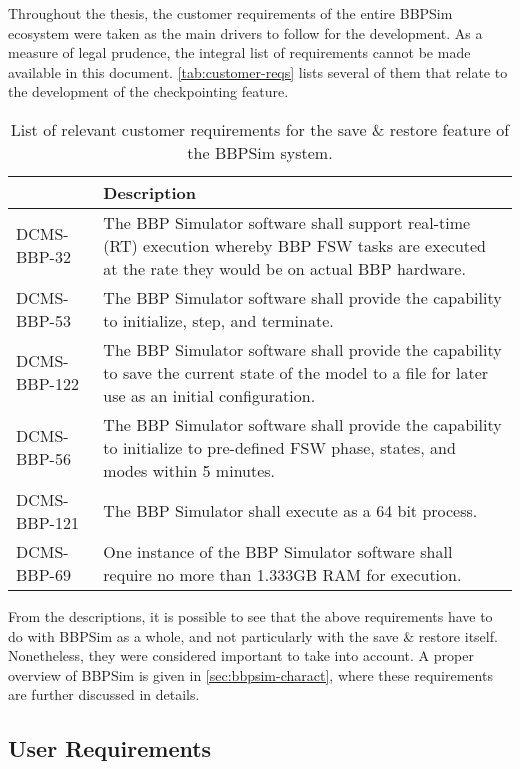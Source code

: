 {Throughout the thesis, the customer requirements of the entire \gls{BBPSim} ecosystem were taken as the main drivers to follow for the development. As a measure of legal prudence, the integral list of requirements cannot be made available in this document. \autoref{tab:customer-reqs} lists several of them that relate to the development of the checkpointing feature.  
\begin{table}[htbp]
	\vspace{12pt}
	\centering
	\begin{tabularx}{\linewidth}{>{\centering}p{3cm} X}
		\toprule
		{\bfseries Requirement\newline Number} & \textbf{Description}\\
		\midrule
		DCMS-BBP-32 & {The BBP Simulator software shall support real-time (RT) execution whereby BBP FSW tasks are executed at the rate they would be on actual BBP hardware.}\\
		\midrule
		DCMS-BBP-53 & {The BBP Simulator software shall provide the capability to initialize, step, and terminate.}\\
		\midrule
		DCMS-BBP-122 & {The BBP Simulator software shall provide the capability to save the current state of the model to a file for later use as an initial configuration.}\\
		\midrule
		DCMS-BBP-56 & {The BBP Simulator software shall provide the capability to initialize to pre-defined FSW phase, states, and modes within 5 minutes.}\\
		\midrule
		DCMS-BBP-121 & {The BBP Simulator shall execute as a 64 bit process.}\\
		\midrule
		DCMS-BBP-69 & {One instance of the BBP Simulator software shall require no more than 1.333GB RAM for execution.}\\
		\bottomrule
	\end{tabularx}
	\caption{List of relevant customer requirements for the save \& restore feature of the \gls{BBPSim} system.}
	\label{tab:customer-reqs}
\end{table}

From the descriptions, it is possible to see that the above requirements have to do with \gls{BBPSim} as a whole, and not particularly with the save \& restore itself. Nonetheless, they were considered important to take into account. A proper overview of \gls{BBPSim} is given in \autoref{sec:bbpsim-charact}, where these requirements are further discussed in details.

\subsection*{User Requirements}

}
